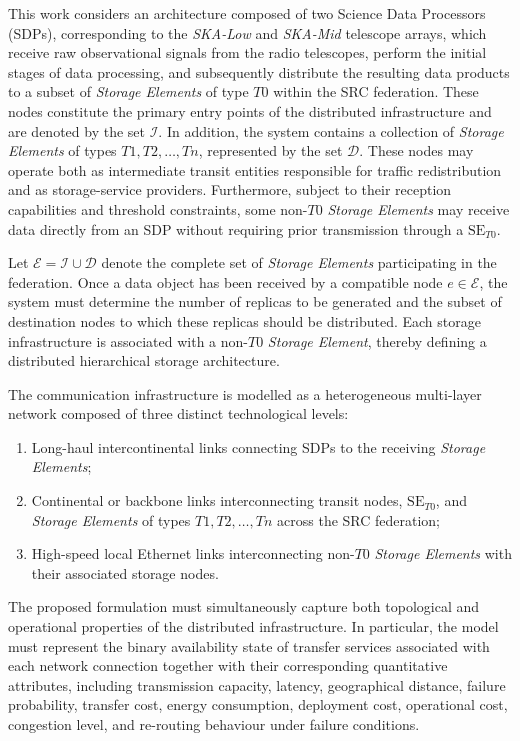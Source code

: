 \documentclass[a4paper,fleqn]{cas-dc}
\newcommand{\Iset}{\mathcal{I}}
\newcommand{\Dset}{\mathcal{D}}
\newcommand{\Eset}{\mathcal{E}}
\begin{document}
This work considers an architecture composed of two Science Data Processors (SDPs), corresponding to the \emph{SKA-Low} and \emph{SKA-Mid} telescope arrays, which receive raw observational signals from the radio telescopes, perform the initial stages of data processing, and subsequently distribute the resulting data products to a subset of \emph{Storage Elements} of type \(T0\) within the SRC federation. These nodes constitute the primary entry points of the distributed infrastructure and are denoted by the set \(\Iset\). In addition, the system contains a collection of \emph{Storage Elements} of types \(T1, T2, \dots ,Tn\), represented by the set \(\Dset\). These nodes may operate both as intermediate transit entities responsible for traffic redistribution and as storage-service providers. Furthermore, subject to their reception capabilities and threshold constraints, some non-\(T0\) \emph{Storage Elements} may receive data directly from an SDP without requiring prior transmission through a \(\mathrm{SE}_{T0}\).

Let \(\Eset = \Iset \cup \Dset\) denote the complete set of \emph{Storage Elements} participating in the federation. Once a data object has been received by a compatible node \(e \in \Eset\), the system must determine the number of replicas to be generated and the subset of destination nodes to which these replicas should be distributed. Each storage infrastructure is associated with a non-\(T0\) \emph{Storage Element}, thereby defining a distributed hierarchical storage architecture.

The communication infrastructure is modelled as a heterogeneous multi-layer network composed of three distinct technological levels:

\begin{enumerate}
    \item Long-haul intercontinental links connecting SDPs to the receiving \emph{Storage Elements};
    
    \item Continental or backbone links interconnecting transit nodes, \(\mathrm{SE}_{T0}\), and \emph{Storage Elements} of types \(T1, T2, \dots, Tn\) across the SRC federation;
    
    \item High-speed local Ethernet links interconnecting non-\(T0\) \emph{Storage Elements} with their associated storage nodes.
\end{enumerate}

The proposed formulation must simultaneously capture both topological and operational properties of the distributed infrastructure. In particular, the model must represent the binary availability state of transfer services associated with each network connection together with their corresponding quantitative attributes, including transmission capacity, latency, geographical distance, failure probability, transfer cost, energy consumption, deployment cost, operational cost, congestion level, and re-routing behaviour under failure conditions.
\end{document}
